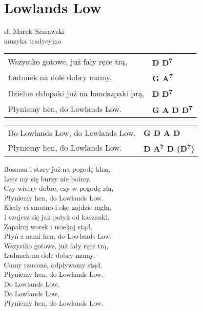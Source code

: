 \section{Lowlands Low}

sł. Marek Szurawski\\
muzyka tradycyjna

\vspace{2em}
\begin{tabular}{@{}p{7cm}@{}l@{}}
Wszystko gotowe, już fały ręce trą, & \bfseries D D\textsuperscript{7}\\
Ładunek na dole dobry mamy. & \bfseries G A\textsuperscript{7}\\
Dzielne chłopaki już na handszpaki prą, & \bfseries D D\textsuperscript{7}\\
Płyniemy hen, do Lowlands Low. & \bfseries G A D D\textsuperscript{7}\\
\end{tabular}

\vspace{1em}
\begin{tabular}{@{}p{7cm}@{}l@{}}
Do Lowlands Low, do Lowlands Low,& \bfseries G D A D\\
Płyniemy hen, do Lowlands Low. & \bfseries D A\textsuperscript{7} D (D\textsuperscript{7})\\
\end{tabular}

Bosman i stary już na pogodę klną, \\
Lecz my się burzy nie boimy. \\
Czy wiatry dobre, czy w pogodę złą, \\
Płyniemy hen, do Lowlands Low. \\

Kiedy ci smutno i oko zajdzie mgłą, \\
I czujesz się jak patyk od kaszanki, \\
Zapakuj worek i uciekaj stąd, \\
Płyń z nami hen, do Lowlands Low. \\

Wszystko gotowe, już fały ręce trą, \\
Ładunek na dole dobry mamy. \\
Cumy rzucone, odpływamy stąd, \\
Płyniemy hen, do Lowlands Low. \\

Do Lowlands Low, \\
Do Lowlands Low, \\
Płyniemy hen, do Lowlands Low. \\